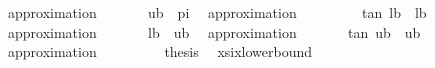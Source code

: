 \begin{isabellebody}
\ {\isacharparenleft}{\kern0pt}approximation\ {}{}{\isacharparenright}{\kern0pt}\isanewline
\ \ \ \ \isamarkupfalse%
\ {\isachardoublequoteopen}{\isacharquery}{\kern0pt}ub\ {\isacharless}{\kern0pt}\ {}{\isacharslash}{\kern0pt}pi{\isachardoublequoteclose}\ \isamarkupfalse%
\ {\isacharparenleft}{\kern0pt}approximation\ {}{\isacharparenright}{\kern0pt}\isanewline
\ \ \ \ \isamarkupfalse%
\ {\isachardoublequoteopen}{}\ {\isasymle}\ tan\ {\isacharparenleft}{\kern0pt}{}{\isacharslash}{\kern0pt}{\isacharquery}{\kern0pt}lb{\isacharparenright}{\kern0pt}\ {\isacharminus}{\kern0pt}\ {}{\isacharslash}{\kern0pt}{\isacharquery}{\kern0pt}lb{\isachardoublequoteclose}\ \isamarkupfalse%
\ {\isacharparenleft}{\kern0pt}approximation\ {}{}{}{\isacharparenright}{\kern0pt}\isanewline
\ \ \ \ \isamarkupfalse%
\ {\isachardoublequoteopen}{\isacharquery}{\kern0pt}lb\ {\isasymle}\ {\isacharquery}{\kern0pt}ub{\isachardoublequoteclose}\ \isamarkupfalse%
\ {\isacharparenleft}{\kern0pt}approximation\ {}{}{}{\isacharparenright}{\kern0pt}\isanewline
\ \ \ \ \isamarkupfalse%
\ {\isachardoublequoteopen}tan\ {\isacharparenleft}{\kern0pt}{}{\isacharslash}{\kern0pt}{\isacharquery}{\kern0pt}ub{\isacharparenright}{\kern0pt}\ {\isacharminus}{\kern0pt}\ {}{\isacharslash}{\kern0pt}{\isacharquery}{\kern0pt}ub\ {\isasymle}\ {}{\isachardoublequoteclose}\ \isamarkupfalse%
\ {\isacharparenleft}{\kern0pt}approximation\ {}{}{}{\isacharparenright}{\kern0pt}\isanewline
\ \ \isamarkupfalse%
\isanewline
\ \ \isamarkupfalse%
\ \isamarkupfalse%
\ {\isacharquery}{\kern0pt}thesis\ \isakeywordONE{{\isachardot}{\kern0pt}}\isamarkupfalse%
\isanewline
{}\isamarkupfalse%
%
\endisatagproof
{\isafoldproof}%
%
\isadelimproof
\isanewline
%
\endisadelimproof
{}\isamarkupfalse%
\ xsix{\isacharunderscore}{\kern0pt}lowerbound{\isacharunderscore}{\kern0pt}{}{}\isanewline
\isanewline
\isanewline
\isanewline
\isanewline
\isanewline
%
\isadelimtheory
\isanewline
%
\endisadelimtheory
%
\isatagtheory
{}\isamarkupfalse%
%
\endisatagtheory
{\isafoldtheory}%
%
\isadelimtheory
%
\endisadelimtheory
%
\end{isabellebody}%
